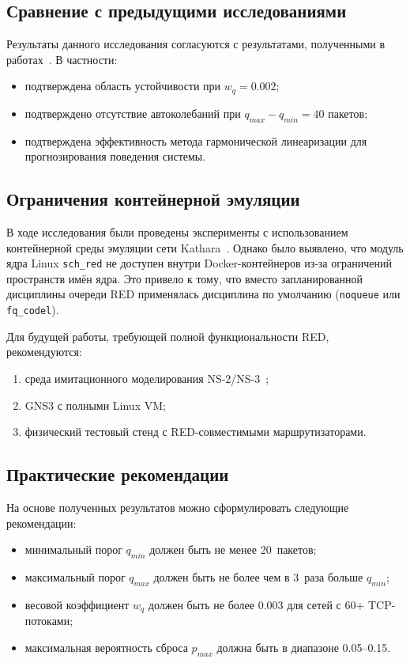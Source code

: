 \documentclass[%
]{ittmm}
\begin{document}
\subsection{Сравнение с предыдущими исследованиями}

Результаты данного исследования согласуются с результатами, полученными в работах~\cite{korolkova2010phd, velieva2019phd}. В частности:
\begin{itemize}
  \item подтверждена область устойчивости при $w_q = 0.002$;
  \item подтверждено отсутствие автоколебаний при $q_{max} - q_{min} = 40$ пакетов;
  \item подтверждена эффективность метода гармонической линеаризации для прогнозирования поведения системы.
\end{itemize}

\subsection{Ограничения контейнерной эмуляции}

В ходе исследования были проведены эксперименты с использованием контейнерной среды эмуляции сети Kathara~\cite{kathara}. Однако было выявлено, что модуль ядра Linux \texttt{sch\_red} не доступен внутри Docker-контейнеров из-за ограничений пространств имён ядра. Это привело к тому, что вместо запланированной дисциплины очереди RED применялась дисциплина по умолчанию (\texttt{noqueue} или \texttt{fq\_codel}).

Для будущей работы, требующей полной функциональности RED, рекомендуются:
\begin{enumerate}
  \item среда имитационного моделирования NS-2/NS-3~\cite{ns2manual};
  \item GNS3 с полными Linux VM;
  \item физический тестовый стенд с RED-совместимыми маршрутизаторами.
\end{enumerate}

\subsection{Практические рекомендации}

На основе полученных результатов можно сформулировать следующие рекомендации:
\begin{itemize}
  \item минимальный порог $q_{min}$ должен быть не менее 20~пакетов;
  \item максимальный порог $q_{max}$ должен быть не более чем в 3~раза больше $q_{min}$;
  \item весовой коэффициент $w_q$ должен быть не более 0.003 для сетей с 60+ TCP-потоками;
  \item максимальная вероятность сброса $p_{max}$ должна быть в диапазоне 0.05--0.15.
\end{itemize}
\end{document}
